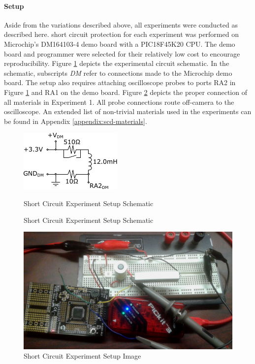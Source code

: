 \paragraph{Setup}
Aside from the variations described above, all experiments were conducted as described here.
short circuit protection for each experiment was performed on Microchip's DM164103-4 demo board with a PIC18F45K20 CPU.
The demo board and programmer were selected for their relatively low cost to encourage reproducibility.
Figure \ref{fig:ExperimentSetup} depicts the experimental circuit schematic.
In the schematic, subscripts \textit{DM} refer to connections made to the Microchip demo board.
The setup also requires attaching oscilloscope probes to ports RA2 in Figure \ref{fig:ExperimentSetup} and RA1 on the demo board.
Figure \ref{fig:Experiment1Setup} depicts the proper connection of all materials in Experiment 1.
All probe connections route off-camera to the oscilloscope.
An extended list of non-trivial materials used in the experiments can be found in Appendix \ref{appendix:scd-materials}.
\begin{figure}
    \centering
    \includegraphics[width=0.45\linewidth]{fig/Experiment_Setup.pdf}
    \caption{Short Circuit Experiment Setup Schematic} Short Circuit Experiment Setup Schematic
    \label{fig:ExperimentSetup}
\end{figure}

\begin{figure}
    \centering
    \includegraphics[width=0.75\linewidth]{fig/SCD_5_9mH_EXP_SETUP.jpg}
    \caption{Short Circuit Experiment Setup Image}
    \label{fig:Experiment1Setup}
\end{figure}

